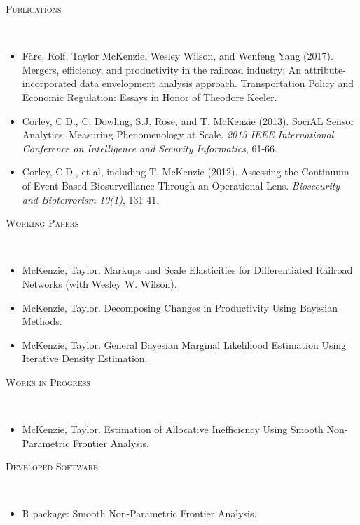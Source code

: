 \documentclass[11pt]{article}
\newenvironment{changemargin}[2]{%
  \begin{list}{}{%
    \setlength{\topsep}{0pt}%
    \setlength{\leftmargin}{#1}%
    \setlength{\rightmargin}{#2}%
    \setlength{\listparindent}{\parindent}%
    \setlength{\itemindent}{\parindent}%
    \setlength{\parsep}{\parskip}%
  }%
  \item[]}{\end{list}
}
\newcommand{\lineover}{
	\begin{changemargin}{-0.05in}{-0.05in}
		\vspace*{-8pt}
		\hrulefill \\
		\vspace*{-2pt}
	\end{changemargin}
}
\newcommand{\header}[1]{
	\begin{changemargin}{-0.5in}{-0.5in}
		\scshape{#1}\\
  	\lineover
	\end{changemargin}
}
\newenvironment{body} {
	\vspace*{-16pt}
	\begin{changemargin}{-0.25in}{-0.5in}
  }	
	{\end{changemargin}
}
\begin{document}
\smallskip
\header{Publications}

\begin{body}
\vspace{14pt}
\begin{itemize}
	\item F\"{a}re, Rolf, Taylor McKenzie, Wesley Wilson, and Wenfeng Yang (2017). Mergers, efficiency, and productivity in the railroad industry: An attribute-incorporated data envelopment analysis approach. Transportation Policy and Economic Regulation: Essays in Honor of Theodore Keeler.
	\item Corley, C.D., C. Dowling, S.J. Rose, and T. McKenzie (2013). SociAL Sensor Analytics: Measuring Phenomenology at Scale. \textit{2013 IEEE International Conference on Intelligence and Security Informatics}, 61-66.
	\item Corley, C.D., et al, including T. McKenzie (2012). Assessing the Continuum of Event-Based Biosurveillance Through an Operational Lens. \textit{Biosecurity and Bioterrorism 10(1)}, 131-41.
\end{itemize}
\end{body}

\smallskip
\header{Working Papers}

\begin{body}
\vspace{14pt}
\begin{itemize}
	\item McKenzie, Taylor. Markups and Scale Elasticities for Differentiated Railroad Networks (with Wesley W. Wilson).
	\item McKenzie, Taylor. Decomposing Changes in Productivity Using Bayesian Methods.
	\item McKenzie, Taylor. General Bayesian Marginal Likelihood Estimation Using Iterative Density Estimation.
\end{itemize}
\end{body}

\smallskip
\header{Works in Progress}

\begin{body}
	\vspace{14pt}
	\begin{itemize}
		\item McKenzie, Taylor. Estimation of Allocative Inefficiency Using Smooth Non-Parametric Frontier Analysis.
	\end{itemize}
\end{body}

\smallskip
\header{Developed Software}
\begin{body}
	\vspace{14pt}
	\begin{itemize}
		\item R package: Smooth Non-Parametric Frontier Analysis.
	\end{itemize}
\end{body}
\end{document}
